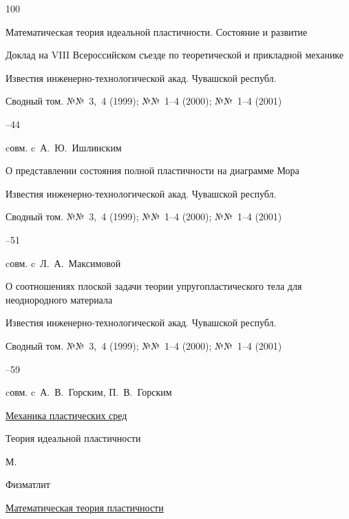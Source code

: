 \begin{thebibliography}{100}

\paper Математическая теория идеальной пластичности. Состояние и развитие

\paperinfo Доклад на VIII Всероссийском съезде по теоретической и прикладной механике 

\jour Известия инженерно-технологической акад. Чувашской республ.\nofrills

\volinfo  Сводный том. №№~3,~4 (1999); №№~1–4 (2000); №№~1–4 (2001)

–44 

\miscnote cовм. c~А.~Ю.~Ишлинским




\paper О представлении состояния полной пластичности на диаграмме Мора 

\jour Известия инженерно-технологической акад. Чувашской республ.\nofrills

\volinfo  Сводный том. №№~3,~4 (1999); №№~1–4 (2000); №№~1–4 (2001)

–51 

\miscnote cовм. c~Л.~А.~Максимовой




\paper О соотношениях плоской задачи теории упругопластического тела для неоднородного материала 

\jour Известия инженерно-технологической акад. Чувашской республ.\nofrills

\volinfo  Сводный том. №№~3,~4 (1999); №№~1–4 (2000); №№~1–4 (2001)

–59 

\miscnote cовм. c~А.~В.~Горским, П.~В.~Горским




\book \href{http://elibrary.ru/item.asp?id=24056525}{Механика пластических сред}


\volinfo Теория идеальной пластичности

\publaddr М.

\publ Физматлит







\book \href{http://elibrary.ru/item.asp?id=23348002}{Математическая теория пластичности}


\end{thebibliography}
